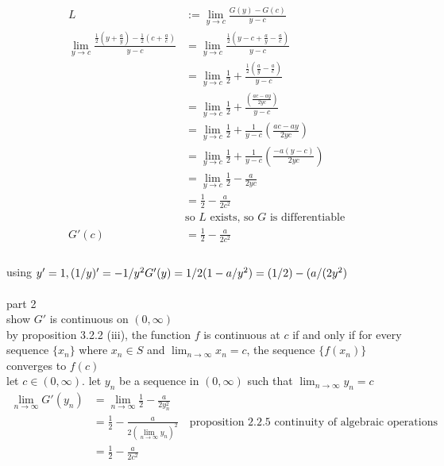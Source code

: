\documentclass[12pt, border = 4pt, multi]{article} %
\begin{document}
\begin{align*}
L &:= \lim_{y \rightarrow c} \frac{G(y) - G(c)}{y - c}\\
\lim_{y \rightarrow c} \frac{\frac{1}{2}\left(y + \frac{a}{y}\right) - \frac{1}{2}\left(c + \frac{a}{c}\right)}{y - c} &= \lim_{y \rightarrow c} \frac{\frac{1}{2}\left(y - c + \frac{a}{y} - \frac{a}{c}\right)}{y - c}\\
&= \lim_{y \rightarrow c}\frac{1}{2} + \frac{\frac{1}{2}\left(\frac{a}{y} - \frac{a}{c}\right)}{y - c}\\
&= \lim_{y \rightarrow c}\frac{1}{2} + \frac{\left(\frac{ac - ay}{2yc}\right)}{y - c}\\
&= \lim_{y \rightarrow c}\frac{1}{2} + \frac{1}{y - c}\left(\frac{ac - ay}{2yc}\right)\\
&= \lim_{y \rightarrow c}\frac{1}{2} + \frac{1}{y - c}\left(\frac{-a(y - c)}{2yc}\right)\\
&= \lim_{y \rightarrow c}\frac{1}{2} - \frac{a}{2yc}\\
&= \frac{1}{2} - \frac{a}{2c ^ 2}\\
&\text{so $L$ exists, so $G$ is differentiable}\\
G'(c) &= \frac{1}{2} - \frac{a}{2c ^ 2}\\
\end{align*}
\\
using $y' = 1, (1 / y)' = -1 / y ^ 2\\
G'(y) = 1 / 2(1 - a / y ^ 2)\\
= (1 / 2) - (a / (2 y ^ 2)$\\
\\
part 2\\
show $G'$ is continuous on $(0, \infty)$\\
by proposition 3.2.2 (iii), the function $f$ is continuous at $c$ if and only if for every sequence $\{x_n\}$ where $x_n \in S$ and
$\lim_{n \rightarrow \infty} x_n = c$, the sequence $\{f(x_n)\}$ converges to $f(c)$\\
let $c \in (0, \infty)$. let ${y_n}$ be a sequence in $(0, \infty)$ such that $\lim_{n \rightarrow \infty} y_n = c$\\
\begin{align*}
\lim_{n \rightarrow \infty} G'(y_n) &= \lim_{n \rightarrow \infty} \frac{1}{2} - \frac{a}{2y_n ^ 2}\\
&= \frac{1}{2} - \frac{a}{2(\lim_{n \rightarrow \infty}y_n) ^ 2} \quad \text{proposition 2.2.5 continuity of algebraic operations}\\
&= \frac{1}{2} - \frac{a}{2 c ^ 2}
\end{align*}
\end{document}
